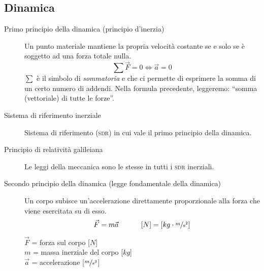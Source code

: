 \documentclass[a4paper,11pt,italian]{article}
\begin{document}
\subsection{Dinamica}
\begin{description}
  \item[Primo principio della dinamica (principio d'inerzia)] 
  Un punto materiale mantiene la propria velocità costante se e solo se è soggetto ad una forza totale nulla.\[ \sum \vec{F} = 0 \Longleftrightarrow \vec{a}= 0 \]
  $ \sum $ è il simbolo di \emph{sommatoria} e che ci permette di esprimere la somma di un certo numero di addendi. Nella formula precedente, leggeremo: ``somma (vettoriale) di tutte le forze''.
  
  \item[Sistema di riferimento inerziale] 
  Sistema di riferimento (\textsc{sdr}) in cui vale il primo principio della dinamica.
  
   \item[Principio di relatività galileiana] 
   Le leggi della meccanica sono le stesse in tutti i \textsc{sdr} inerziali.
   
%   
  
  \item[Secondo principio della dinamica (legge fondamentale della dinamica)] 
  Un corpo subisce un'accelerazione direttamente proporzionale alla forza che viene esercitata su di esso.
  \[ \vec{F} = m  \vec{a}   \hspace*{3em} \left[ N \right] = \left[ kg \cdot \sfrac{m}{s^2} \right] \]
  \begin{multicols}{2}
  $ \vec{F}  $ = forza sul corpo [$ N $]\\
  $ m $ = massa inerziale del corpo [$ kg $]\\
  $ \vec{a}  $ = accelerazione [$ \sfrac{m}{s^2} $]
  \end{multicols}
  

\end{description}
\end{document}
